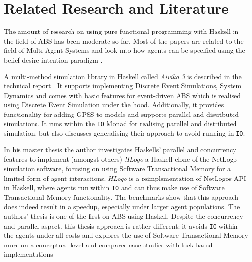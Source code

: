 \section{Related Research and Literature}
\label{sec:literature}
The amount of research on using pure functional programming with Haskell in the field of ABS has been moderate so far. Most of the papers are related to the field of Multi-Agent Systems and look into how agents can be specified using the belief-desire-intention paradigm \cite{de_jong_suitability_2014,jankovic_functional_2007,sulzmann_specifying_2007}.

A multi-method simulation library in Haskell called \textit{Aivika 3} is described in the technical report \cite{sorokin_aivika_2015}. It supports implementing Discrete Event Simulations, System Dynamics and comes with basic features for event-driven ABS which is realised using Discrete Event Simulation under the hood. Additionally, it provides functionality for adding GPSS to models and supports parallel and distributed simulations. It runs within the \texttt{IO} Monad for realising parallel and distributed simulation, but also discusses generalising their approach to avoid running in \texttt{IO}.

In his master thesis \cite{bezirgiannis_improving_2013} the author investigates Haskells' parallel and concurrency features to implement (amongst others) \textit{HLogo} a Haskell clone of the NetLogo \cite{wilensky_introduction_2015} simulation software, focusing on using Software Transactional Memory for a limited form of agent interactions. \textit{HLogo} is a reimplementation of NetLogos API in Haskell, where agents run within \texttt{IO} and can thus make use of Software Transactional Memory functionality. The benchmarks show that this approach does indeed result in a speedup, especially under larger agent populations. The authors' thesis is one of the first on ABS using Haskell. Despite the concurrency and parallel aspect, this thesis approach is rather different: it avoids \texttt{IO} within the agents under all costs and explores the use of Software Transactional Memory more on a conceptual level and compares case studies with lock-based implementations.

